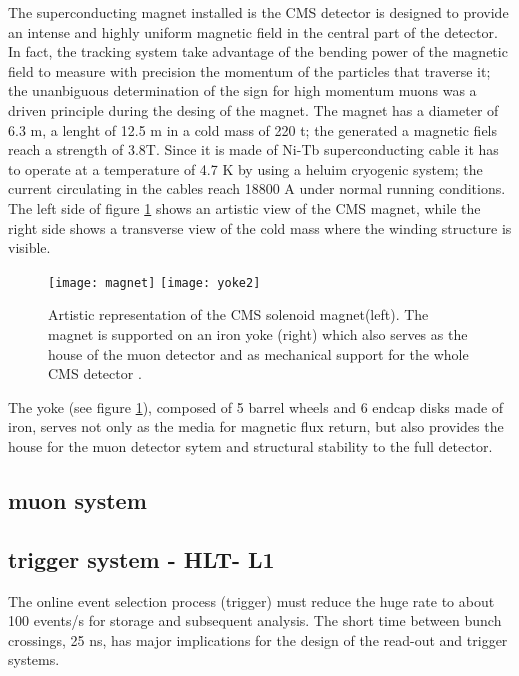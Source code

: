 \noindent The superconducting magnet installed is the CMS detector is designed to provide an intense and highly uniform magnetic field in the central part of the detector. In fact, the tracking system take advantage of the bending power of the magnetic field to measure with precision the momentum of the particles that traverse it; the unanbiguous determination of the sign for high momentum muons was a driven principle  during the desing of the magnet. The magnet has a diameter of 6.3 m, a lenght of 12.5 m in a cold mass of 220 t; the generated a magnetic fiels reach a strength of 3.8T. Since it is made of Ni-Tb superconducting cable it has to operate at a temperature of 4.7 K by using a heluim cryogenic system; the current circulating in the cables reach 18800 A under normal running conditions. The left side of figure \ref{fig:yoke} shows an artistic view of the CMS magnet, while the right side shows a transverse view of the cold mass where the winding structure is visible. \\
\begin{figure}[h!]
  \centering
  \texttt{[image: magnet]}
  \texttt{[image: yoke2]}
  \caption[CMS solenoid magnet]{Artistic representation of the CMS solenoid magnet(left). The magnet is supported on an iron yoke (right) which also serves as the house of the muon detector and as mechanical support for the whole CMS detector \cite{yoke2}.}
  \label{fig:yoke}
\end{figure}

\noindent The yoke (see figure \ref{fig:yoke}), composed of 5 barrel wheels and 6 endcap disks made of iron, serves not only as the media for magnetic flux return, but also provides the house for the muon detector sytem and structural stability to the full detector.     

\subsection{muon system }
\subsection{trigger system - HLT- L1 }


The
online event selection process (trigger) must reduce the huge rate to about 100 events/s for storage
and subsequent analysis. The short time between bunch crossings, 25 ns, has major implications
for the design of the read-out and trigger systems.


